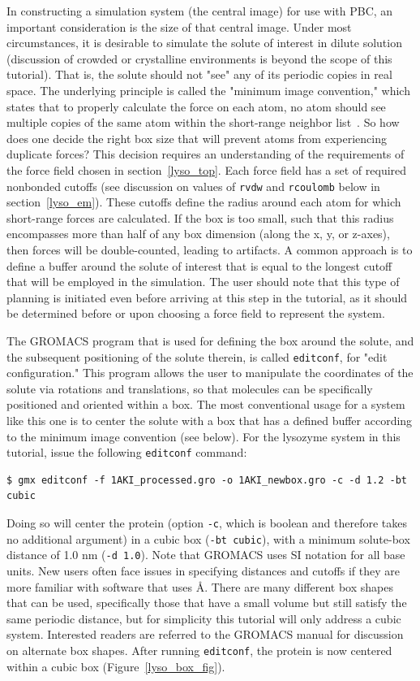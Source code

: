 \documentclass[9pt,tutorial,pubversion]{livecoms}
\begin{document}
In constructing a simulation system (the central image) for use with PBC, an important consideration is the size of that central image. Under most circumstances, it is desirable to simulate the solute of interest in dilute solution (discussion of crowded or crystalline environments is beyond the scope of this tutorial). That is, the solute should not "see" any of its periodic copies in real space. The underlying principle is called the "minimum image convention," which states that to properly calculate the force on each atom, no atom should see multiple copies of the same atom within the short-range neighbor list~\cite{Frenkel2001}. So how does one decide the right box size that will prevent atoms from experiencing duplicate forces? This decision requires an understanding of the requirements of the force field chosen in section~\ref{lyso_top}. Each force field has a set of required nonbonded cutoffs (see discussion on values of \texttt{rvdw} and \texttt{rcoulomb} below in section~\ref{lyso_em}). These cutoffs define the radius around each atom for which short-range forces are calculated. If the box is too small, such that this radius encompasses more than half of any box dimension (along the x, y, or z-axes), then forces will be double-counted, leading to artifacts. A common approach is to define a buffer around the solute of interest that is equal to the longest cutoff that will be employed in the simulation. The user should note that this type of planning is initiated even before arriving at this step in the tutorial, as it should be determined before or upon choosing a force field to represent the system.

The GROMACS program that is used for defining the box around the solute, and the subsequent positioning of the solute therein, is called \texttt{editconf}, for "edit configuration." This program allows the user to manipulate the coordinates of the solute via rotations and translations, so that molecules can be specifically positioned and oriented within a box. The most conventional usage for a system like this one is to center the solute with a box that has a defined buffer according to the minimum image convention (see below). For the lysozyme system in this tutorial, issue the following \texttt{editconf} command:

\begin{lstlisting}
$ gmx editconf -f 1AKI_processed.gro -o 1AKI_newbox.gro -c -d 1.2 -bt cubic
\end{lstlisting}
%
Doing so will center the protein (option \texttt{-c}, which is boolean and therefore takes no additional argument) in a cubic box (\texttt{-bt cubic}), with a minimum solute-box distance of 1.0 nm (\texttt{-d 1.0}). Note that GROMACS uses SI notation for all base units. New users often face issues in specifying distances and cutoffs if they are more familiar with software that uses \AA. There are many different box shapes that can be used, specifically those that have a small volume but still satisfy the same periodic distance, but for simplicity this tutorial will only address a cubic system. Interested readers are referred to the GROMACS manual for discussion on alternate box shapes. After running \texttt{editconf}, the protein is now centered within a cubic box (Figure~\ref{lyso_box_fig}).
\end{document}
